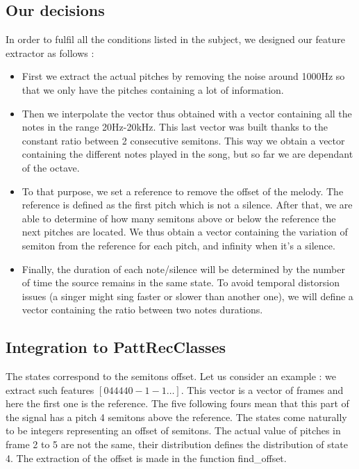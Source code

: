 \documentclass[a4paper]{report}
\begin{document}
\subsection{Our decisions}
In order to fulfil all the conditions listed in the subject, we designed our feature extractor as follows :
\begin{itemize}
\item First we extract the actual pitches by removing the noise around 1000Hz so that we only have the pitches containing a lot of information.

\item Then we interpolate the vector thus obtained with a vector containing all the notes in the range 20Hz-20kHz. This last vector was built thanks to the constant ratio between 2 consecutive semitons. This way we obtain a vector containing the different notes played in the song, but so far we are dependant of the octave.

\item To that purpose, we set a reference to remove the offset of the melody. The reference is defined as the first pitch which is not a silence. After that, we are able to determine of how many semitons above or below the reference the next pitches are located. We thus obtain a vector containing the variation of semiton from the reference for each pitch, and infinity when it's a silence.

\item Finally, the duration of each note/silence will be determined by the number of time the source remains in the same state. To avoid temporal distorsion issues (a singer might sing faster or slower than another one), we will define a vector containing the ratio between two notes durations.
\end{itemize}

\subsection{Integration to PattRecClasses}
The states correspond to the semitons offset. Let us consider an example : we extract such features $[0 4 4 4 4 0 -1 -1 \dots]$. This vector is a vector of frames and here the first one is the reference. The five following fours mean that this part of the signal has a pitch 4 semitons above the reference. The states come naturally to be integers representing an offset of semitons. The actual value of pitches in frame 2 to 5 are not the same, their distribution defines the distribution of state 4.
The extraction of the offset is made in the function find\_offset.
\end{document}
